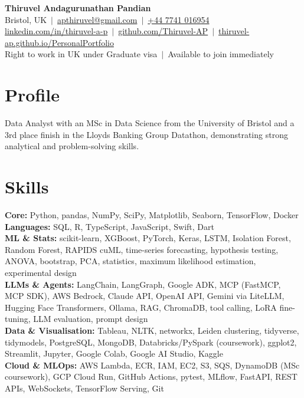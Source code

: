 \documentclass[a4paper,11pt]{article}
\begin{document}
\fontsize{11}{13.2}\selectfont

\begin{center}
  {\LARGE\bfseries Thiruvel Andagurunathan Pandian}\\[3pt]
  Bristol, UK \,$|$\, \href{mailto:apthiruvel@gmail.com}{apthiruvel@gmail.com} \,$|$\, \href{tel:+447741016954}{+44 7741 016954}\\[1pt]
\href{https://www.linkedin.com/in/thiruvel-a-p/}{linkedin.com/in/thiruvel-a-p} \,$|$\, \href{https://github.com/Thiruvel-AP}{github.com/Thiruvel-AP} \,$|$\, \href{https://thiruvel-ap.github.io/PersonalPortfolio/}{thiruvel-ap.github.io/PersonalPortfolio}\\[1pt]
  Right to work in UK under Graduate visa \,$|$\, Available to join immediately
\end{center}

\section{Profile}
Data Analyst with an MSc in Data Science from the University of Bristol and a 3rd place finish in the Lloyd\textquotesingle{}s Banking Group Datathon, demonstrating strong analytical and problem-solving skills.

\section{Skills}
\textbf{Core:} Python, pandas, NumPy, SciPy, Matplotlib, Seaborn, TensorFlow, Docker\\[2pt]
\textbf{Languages:} SQL, R, TypeScript, JavaScript, Swift, Dart\\[2pt]
\textbf{ML \& Stats:} scikit-learn, XGBoost, PyTorch, Keras, LSTM, Isolation Forest, Random Forest, RAPIDS cuML, time-series forecasting, hypothesis testing, ANOVA, bootstrap, PCA, statistics, maximum likelihood estimation, experimental design\\[2pt]
\textbf{LLMs \& Agents:} LangChain, LangGraph, Google ADK, MCP (FastMCP, MCP SDK), AWS Bedrock, Claude API, OpenAI API, Gemini via LiteLLM, Hugging Face Transformers, Ollama, RAG, ChromaDB, tool calling, LoRA fine-tuning, LLM evaluation, prompt design\\[2pt]
\textbf{Data \& Visualisation:} Tableau, NLTK, networkx, Leiden clustering, tidyverse, tidymodels, PostgreSQL, MongoDB, Databricks/PySpark (coursework), ggplot2, Streamlit, Jupyter, Google Colab, Google AI Studio, Kaggle\\[2pt]
\textbf{Cloud \& MLOps:} AWS Lambda, ECR, IAM, EC2, S3, SQS, DynamoDB (MSc coursework), GCP Cloud Run, GitHub Actions, pytest, MLflow, FastAPI, REST APIs, WebSockets, TensorFlow Serving, Git
\end{document}
